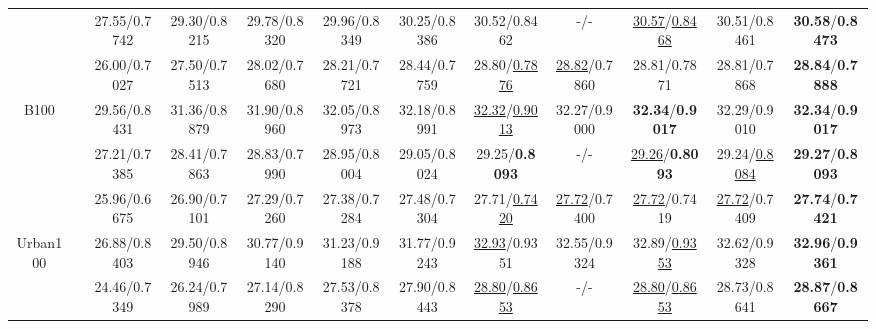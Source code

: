 \documentclass{bmvc2k}
\begin{document}
\begin{table*}[htbp]
{\begin{tabular}{|c|c|c|c|c|c|c|c|c|c|c|c|}
			                                        &               &       27.55/0.7742       &      29.30/0.8215       &      29.78/0.8320      &    29.96/0.8349     &  30.25/0.8386   &           {30.52}/{0.8462}           &           -/-            & \underline{30.57}/\underline{0.8468} &             30.51/0.8461             &    \textbf{30.58}/\textbf{0.8473}    \\
			                                        &               &       26.00/0.7027       &      27.50/0.7513       &      28.02/0.7680      &    28.21/0.7721     &  28.44/0.7759   &       28.80/\underline{0.7876}       & \underline{28.82}/0.7860 &             28.81/0.7871             &             28.81/0.7868             &    \textbf{28.84}/\textbf{0.7888}    \\ \hline\hline
			         \multirow{3}{*}{B100}          &               &       29.56/0.8431       &      31.36/0.8879       &      31.90/0.8960      &    32.05/0.8973     &  32.18/0.8991   & \underline{32.32}/\underline{0.9013} &       32.27/0.9000       &    \textbf{32.34}/\textbf{0.9017}    &             32.29/0.9010             &    \textbf{32.34}/\textbf{0.9017}    \\
			                                        &               &       27.21/0.7385       &      28.41/0.7863       &      28.83/0.7990      &    28.95/0.8004     &  29.05/0.8024   &       {29.25}/\textbf{0.8093}        &           -/-            &  \underline {29.26}/\textbf{0.8093}  &      29.24/\underline {0.8084}       &    \textbf{29.27}/\textbf{0.8093}    \\
			                                        &               &       25.96/0.6675       &      26.90/0.7101       &      27.29/0.7260      &    27.38/0.7284     &  27.48/0.7304   &       27.71/\underline{0.7420}       & \underline{27.72}/0.7400 &      \underline{27.72}/{0.7419}      &       \underline{27.72}/0.7409       &    \textbf{27.74}/\textbf{0.7421}    \\ \hline\hline
			       \multirow{3}{*}{Urban100}        &               &       26.88/0.8403       &      29.50/0.8946       &      30.77/0.9140      &    31.23/0.9188     &  31.77/0.9243   &      \underline{32.93}/{0.9351}      &       32.55/0.9324       &       32.89/\underline{0.9353}       &             32.62/0.9328             &    \textbf{32.96}/\textbf{0.9361}    \\
			                                        &               &       24.46/0.7349       &      26.24/0.7989       &      27.14/0.8290      &    27.53/0.8378     &  27.90/0.8443   & \underline{28.80}/\underline{0.8653} &           -/-            & \underline{28.80}/\underline{0.8653} &             28.73/0.8641             &    \textbf{28.87}/\textbf{0.8667}    \\

\end{tabular}}
\end{table*}
\end{document}

